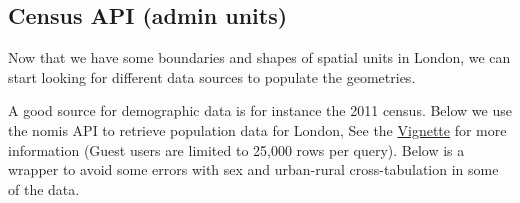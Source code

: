 \documentclass[
  letterpaper,
  DIV=11,
  numbers=noendperiod]{scrreprt}
\newenvironment{Shaded}{\begin{snugshade}}{\end{snugshade}}
\newcommand{\AttributeTok}[1]{\textcolor[rgb]{0.40,0.45,0.13}{#1}}
\newcommand{\CommentTok}[1]{\textcolor[rgb]{0.37,0.37,0.37}{#1}}
\newcommand{\DocumentationTok}[1]{\textcolor[rgb]{0.37,0.37,0.37}{\textit{#1}}}
\newcommand{\FunctionTok}[1]{\textcolor[rgb]{0.28,0.35,0.67}{#1}}
\newcommand{\NormalTok}[1]{\textcolor[rgb]{0.00,0.23,0.31}{#1}}
\newcommand{\OtherTok}[1]{\textcolor[rgb]{0.00,0.23,0.31}{#1}}
\newcommand{\SpecialCharTok}[1]{\textcolor[rgb]{0.37,0.37,0.37}{#1}}
\newcommand{\StringTok}[1]{\textcolor[rgb]{0.13,0.47,0.30}{#1}}
\begin{document}
\hypertarget{census-api-admin-units}{%
\subsection{Census API (admin units)}\label{census-api-admin-units}}

Now that we have some boundaries and shapes of spatial units in London,
we can start looking for different data sources to populate the
geometries.

A good source for demographic data is for instance the 2011 census.
Below we use the nomis API to retrieve population data for London, See
the
\href{https://cran.r-project.org/web/packages/nomisr/vignettes/introduction.html}{Vignette}
for more information (Guest users are limited to 25,000 rows per query).
Below is a wrapper to avoid some errors with sex and urban-rural
cross-tabulation in some of the data.

\begin{Shaded}
\end{Shaded}
\end{document}
